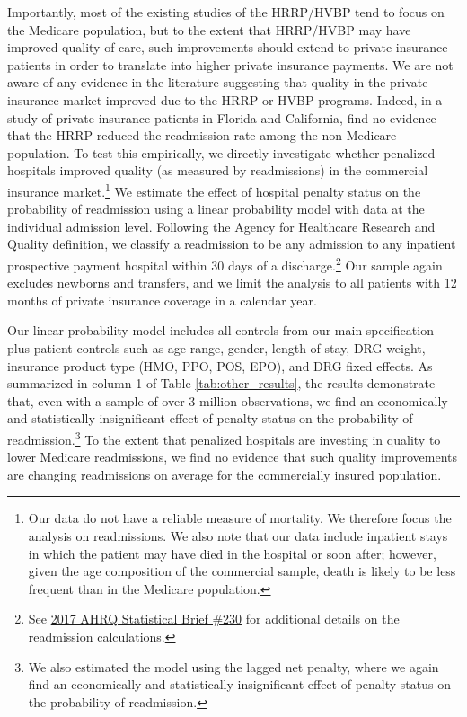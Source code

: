 \documentclass[12pt]{article}
\begin{document}
Importantly, most of the existing studies of the HRRP/HVBP tend to focus on the Medicare population, but to the extent that HRRP/HVBP may have improved quality of care, such improvements should extend to private insurance patients in order to translate into higher private insurance payments. We are not aware of any evidence in the literature suggesting that quality in the private insurance market improved due to the HRRP or HVBP programs. Indeed, in a study of private insurance patients in Florida and California, \cite{demiralp2017} find no evidence that the HRRP reduced the readmission rate among the non-Medicare population. To test this empirically, we directly investigate whether penalized hospitals improved quality (as measured by readmissions) in the commercial insurance market.\footnote{Our data do not have a reliable measure of mortality. We therefore focus the analysis on readmissions. We also note that our data include inpatient stays in which the patient may have died in the hospital or soon after; however, given the age composition of the commercial sample, death is likely to be less frequent than in the Medicare population.} We estimate the effect of hospital penalty status on the probability of readmission using a linear probability model with data at the individual admission level. Following the Agency for Healthcare Research and Quality definition, we classify a readmission to be any admission to any inpatient prospective payment hospital within 30 days of a discharge.\footnote{See \href{https://www.hcup-us.ahrq.gov/reports/statbriefs/sb230-7-Day-Versus-30-Day-Readmissions.jsp?utm_source=ahrq&utm_medium=en1&utm_term=&utm_content=1&utm_campaign=ahrq_en11_7_2017}{2017 AHRQ Statistical Brief \#230} for additional details on the readmission calculations.} Our sample again excludes newborns and transfers, and we limit the analysis to all patients with 12 months of private insurance coverage in a calendar year.

Our linear probability model includes all controls from our main specification plus patient controls such as age range, gender, length of stay, DRG weight, insurance product type (HMO, PPO, POS, EPO), and DRG fixed effects. As summarized in column 1 of Table \ref{tab:other_results}, the results demonstrate that, even with a sample of over 3 million observations, we find an economically and statistically insignificant effect of penalty status on the probability of readmission.\footnote{We also estimated the model using the lagged net penalty, where we again find an economically and statistically insignificant effect of penalty status on the probability of readmission.} To the extent that penalized hospitals are investing in quality to lower Medicare readmissions, we find no evidence that such quality improvements are changing readmissions on average for the commercially insured population.
\end{document}
